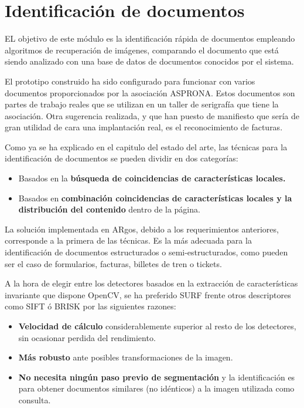 \section{Identificación de documentos}
EL objetivo de este módulo es la identificación rápida de documentos empleando algoritmos de
recuperación de imágenes, comparando el documento que está siendo analizado con una base de datos de
documentos conocidos por el sistema.

El prototipo construido ha sido configurado para funcionar con varios documentos proporcionados
por la asociación ASPRONA. Estos documentos son partes de trabajo reales que se utilizan en un
taller de serigrafía que tiene la asociación. Otra sugerencia realizada, y que han puesto de
manifiesto que sería de gran utilidad de cara una implantación real, es el reconocimiento de facturas.

Como ya se ha explicado en el capitulo del estado del arte, las técnicas para la identificación de
documentos se pueden dividir en dos categorías:

\begin{itemize}
\item Basados en la \textbf{búsqueda de coincidencias de características locales.}
\item Basados en \textbf{combinación coincidencias de características locales y la distribución del contenido} dentro de la página.
\end{itemize}

La solución implementada en ARgos, debido a los requerimientos anteriores, corresponde a la primera
de las técnicas. Es la más adecuada para la identificación de documentos estructurados o
semi-estructurados, como pueden ser el caso de formularios, facturas, billetes de tren o tickets.

A la hora de elegir entre los detectores basados en la extracción de características invariante que
dispone OpenCV, se ha preferido SURF frente otros descriptores como SIFT ó BRISK por las siguientes razones:

\begin{itemize}
\item \textbf{Velocidad de cálculo} considerablemente superior al resto de los detectores, sin ocasionar perdida del rendimiento.
\item \textbf{Más robusto} ante posibles transformaciones de la imagen.
\item \textbf{No necesita ningún paso previo de segmentación} y la identificación es para obtener documentos similares (no
idénticos) a la imagen utilizada como consulta.
\end{itemize}

